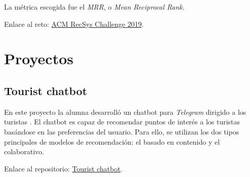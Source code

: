 La métrica escogida fue el \textit{MRR}, o \textit{Mean Reciprocal Rank}.

Enlace al reto: \href{http://www.recsyschallenge.com/2019/}{ACM RecSys Challenge 2019}.

\section{Proyectos}\label{proyectos}
\subsection{Tourist chatbot}\label{chatbot}
En este proyecto la alumna desarrolló un chatbot para \textit{Telegram} dirigido a los turistas \cite{chatbot}. El chatbot es capaz de recomendar puntos de interés a los turistas basándose en las preferencias del usuario. Para ello, se utilizan los dos tipos principales de modelos de recomendación: el basado en contenido y el colaborativo.

Enlace al repositorio: \href{https://github.com/jaswellnitz/tourist-chatbot}{Tourist chatbot}.
